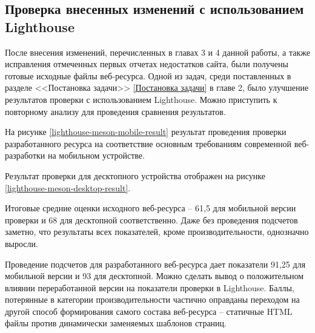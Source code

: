 
\subsection{Проверка внесенных изменений с использованием Lighthouse}

После внесения изменений, перечисленных в главах 3 и 4 данной работы, а также исправления отмеченных первых отчетах недостатков сайта, были получены готовые исходные файлы веб-ресурса.
Одной из задач, среди поставленных в разделе <<Постановка задачи>> \ref{Постановка задачи} в главе 2, было улучшение результатов проверки с использованием Lighthouse.
Можно приступить к повторному анализу для проведения сравнения результатов.

На рисунке \ref{lighthouse-meson-mobile-result} результат проведения проверки разработанного ресурса на соответствие основным требованиям современной веб-разработки на мобильном устройстве.



Результат проверки для десктопного устройства отображен на рисунке \ref{lighthouse-meson-desktop-result}.


Итоговые средние оценки исходного веб-ресурса -- 61,5 для мобильной версии проверки и 68 для десктопной соответственно.
Даже без проведения подсчетов заметно, что результаты всех показателей, кроме производительности, однозначно выросли.

Проведение подсчетов для разработанного веб-ресурса дает показатели 91,25 для мобильной версии и 93 для десктопной.
Можно сделать вывод о положительном влиянии переработанной версии на показатели проверки в Lighthouse.
Баллы, потерянные в категории производительности частично оправданы переходом на другой способ формирования самого состава веб-ресурса -- статичные HTML файлы против динамически заменяемых шаблонов страниц.

\clearpage
